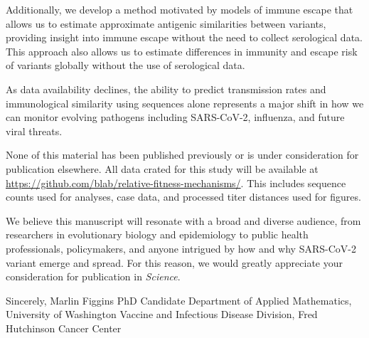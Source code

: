 \documentclass[11pt]{article}
\begin{document}
Additionally, we develop a method motivated by models of immune escape that allows us to estimate approximate antigenic similarities between variants, providing insight into immune escape without the need to collect serological data.
This approach also allows us to estimate differences in immunity and escape risk of variants globally without the use of serological data.

As data availability declines, the ability to predict transmission rates and immunological similarity using sequences alone represents a major shift in how we can monitor evolving pathogens including SARS-CoV-2, influenza, and future viral threats.

None of this material has been published previously or is under consideration for publication elsewhere.
All data crated for this study will be available at \href{https://github.com/blab/relative-fitness-mechanisms/}{https://github.com/blab/relative-fitness-mechanisms/}.
This includes sequence counts used for analyses, case data, and processed titer distances used for figures.

We believe this manuscript will resonate with a broad and diverse audience, from researchers in evolutionary biology and epidemiology to public health professionals, policymakers, and anyone intrigued by how and why SARS-CoV-2 variant emerge and spread.
For this reason, we would greatly appreciate your consideration for publication in \textit{Science}.

\vspace{0.3in} %

Sincerely, \newline
\vspace{0.05in} \newline
Marlin Figgins \newline
PhD Candidate \newline
Department of Applied Mathematics, University of Washington \newline
Vaccine and Infectious Disease Division, Fred Hutchinson Cancer Center
\end{document}
